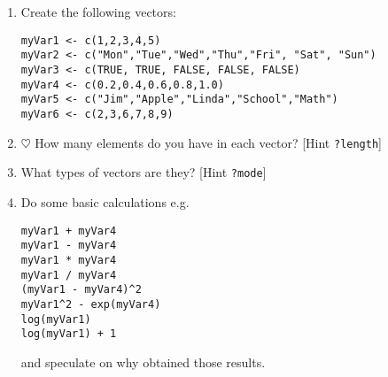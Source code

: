 \documentclass[a4paper]{article}
\begin{document}
\section{}
\begin{enumerate}
\item Create the following vectors:
\begin{verbatim}
myVar1 <- c(1,2,3,4,5)
myVar2 <- c("Mon","Tue","Wed","Thu","Fri", "Sat", "Sun")
myVar3 <- c(TRUE, TRUE, FALSE, FALSE, FALSE)
myVar4 <- c(0.2,0.4,0.6,0.8,1.0)
myVar5 <- c("Jim","Apple","Linda","School","Math")
myVar6 <- c(2,3,6,7,8,9)
\end{verbatim}
\item  $\heartsuit$ How many elements do you have in each vector? [Hint \texttt{?length}]
\item What types of vectors are they? [Hint \texttt{?mode}]
\item Do some basic calculations e.g.
\begin{verbatim}
myVar1 + myVar4
myVar1 - myVar4
myVar1 * myVar4
myVar1 / myVar4
(myVar1 - myVar4)^2
myVar1^2 - exp(myVar4)
log(myVar1)
log(myVar1) + 1
\end{verbatim}
and speculate on why obtained those results.
\end{enumerate}
\end{document}
